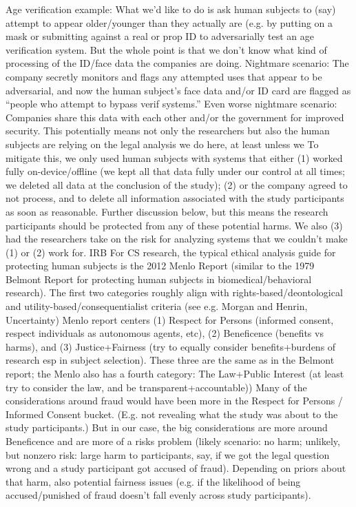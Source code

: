 \2 Age verification example: What we’d like to do is ask human subjects to (say) attempt to appear older/younger than they actually are (e.g. by putting on a mask or submitting against a real or prop ID to adversarially test an age verification system.
\3 But the whole point is that we don’t know what kind of processing of the ID/face data the companies are doing.
\3 Nightmare scenario: The company secretly monitors and flags any attempted uses that appear to be adversarial, and now the human subject’s face data and/or ID card are flagged as “people who attempt to bypass verif systems.”  Even worse nightmare scenario: Companies share this data with each other and/or the government for improved security.  This potentially means not only the researchers but also the human subjects are relying on the legal analysis we do here, at least unless we 
\2 To mitigate this, we only used human subjects with systems that either (1) worked fully on-device/offline (we kept all that data fully under our control at all times; we deleted all data at the conclusion of the study); (2) or the company agreed to not process, and to delete all information associated with the study participants as soon as reasonable.  Further discussion below, but this means the research participants should be protected from any of these potential harms.  We also (3) had the researchers take on the risk for analyzing systems that we couldn’t make (1) or (2) work for.
\1 IRB
\2 For CS research, the typical ethical analysis guide for protecting human subjects is the 2012 Menlo Report (similar to the 1979 Belmont Report for protecting human subjects in biomedical/behavioral research).  The first two categories roughly align with rights-based/deontological and utility-based/consequentialist criteria (see e.g. Morgan and Henrin, Uncertainty)
\2 Menlo report centers (1) Respect for Persons (informed consent, respect individuals as autonomous agents, etc), (2) Beneficence (benefits vs harms), and (3) Justice+Fairness (try to equally consider benefits+burdens of research esp in subject selection).  These three are the same as in the Belmont report; the Menlo also has a fourth category: The Law+Public Interest (at least try to consider the law, and be transparent+accountable))
\3 Many of the considerations around fraud would have been more in the Respect for Persons / Informed Consent bucket.  (E.g. not revealing what the study was about to the study participants.)  But in our case, the big considerations are more around Beneficence and are more of a risks problem (likely scenario: no harm; unlikely, but nonzero risk: large harm to participants, say, if we got the legal question wrong and a study participant got accused of fraud).  Depending on priors about that harm, also potential fairness issues (e.g. if the likelihood of being accused/punished of fraud doesn’t fall evenly across study participants).
